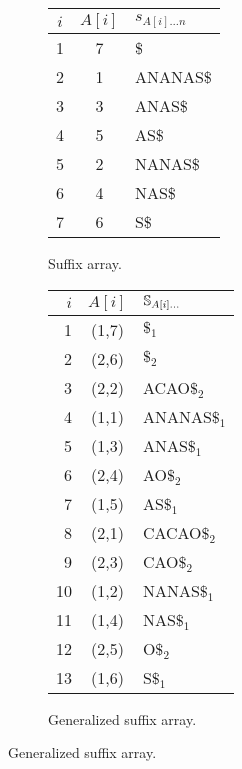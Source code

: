\begin{figure}[b]
\begin{center}
\caption[Example of (generalized) suffix array]{(Generalized) suffix array. () Suffix array of the string {\ttfamily ANANAS\$}. () Generalized suffix array of the string collection $\Sc = \{$ {\ttfamily ANANAS$\$_1$}, {\ttfamily CACAO$\$_2$} $\}$.}

\begin{subfigure}[t]{0.45\textwidth}
\begin{center}
\caption[Example of suffix array]{Suffix array.}
\label{fig:sa}
\ttfamily
\begin{tabular}{ccl}
$i$ & $A[i]$ & $s_{A[i]\dots n}$\\
\midrule
1 & 7 & \$\\
2 & 1 & ANANAS\$\\
3 & 3 & ANAS\$\\
4 & 5 & AS\$\\
5 & 2 & NANAS\$\\
6 & 4 & NAS\$\\
7 & 6 & S\$\\
\end{tabular}
\end{center}
\end{subfigure}%
\begin{subfigure}[t]{0.45\textwidth}
\begin{center}
\caption[Example of generalized suffix array]{Generalized suffix array.}
\label{fig:gsa}
\ttfamily
\begin{tabular}{rcl}
$i$ & $A[i]$ & $\mathbb {S}_{A[i]\dots}$\\
\midrule
1 & (1,7) & $\$_1$\\
2 & (2,6) & $\$_2$\\
3 & (2,2) & ACAO$\$_2$\\
4 & (1,1) & ANANAS$\$_1$\\
5 & (1,3) & ANAS$\$_1$\\
6 & (2,4) & AO$\$_2$\\
7 & (1,5) & AS$\$_1$\\
8 & (2,1) & CACAO$\$_2$\\
9 & (2,3) & CAO$\$_2$\\
10 & (1,2) & NANAS$\$_1$\\
11 & (1,4) & NAS$\$_1$\\
12 & (2,5) & O$\$_2$\\
13 & (1,6) & S$\$_1$\\
\end{tabular}
\end{center}
\end{subfigure}

\end{center}
\end{figure}

